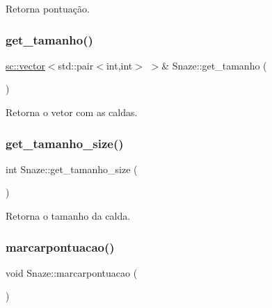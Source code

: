 Retorna pontuação. 

\mbox{\label{classSnaze_a63c97c00033ad4e47f5609016a0cb0f3}} 
\subsubsection{\texorpdfstring{get\+\_\+tamanho()}{get\_tamanho()}}
{\footnotesize\ttfamily \hyperlink{classsc_1_1vector}{sc\+::vector}$<$std\+::pair$<$int,int$>$ $>$\& Snaze\+::get\+\_\+tamanho (\begin{DoxyParamCaption}{ }\end{DoxyParamCaption})\hspace{0.3cm}{\ttfamily [inline]}}



Retorna o vetor com as caldas. 

\mbox{\label{classSnaze_a6704ada161bc8559e71401d5bad59b58}} 
\subsubsection{\texorpdfstring{get\+\_\+tamanho\+\_\+size()}{get\_tamanho\_size()}}
{\footnotesize\ttfamily int Snaze\+::get\+\_\+tamanho\+\_\+size (\begin{DoxyParamCaption}{ }\end{DoxyParamCaption})\hspace{0.3cm}{\ttfamily [inline]}}



Retorna o tamanho da calda. 

\mbox{\label{classSnaze_afb6cfbbeffc84c668c7c205623557654}} 
\subsubsection{\texorpdfstring{marcarpontuacao()}{marcarpontuacao()}}
{\footnotesize\ttfamily void Snaze\+::marcarpontuacao (\begin{DoxyParamCaption}{ }\end{DoxyParamCaption})\hspace{0.3cm}{\ttfamily [inline]}}



